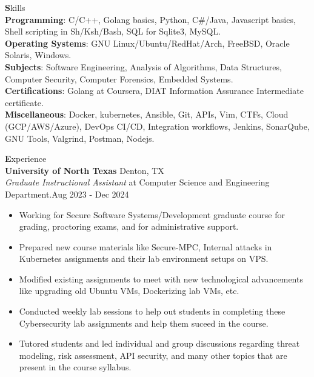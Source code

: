 \documentclass[a4paper]{article}
\begin{document}
{\textbf{S}kills \hrulefill}\\
\textbf{Programming}: C/C++, Golang basics, Python, C\#/Java, Javascript basics, Shell scripting in Sh/Ksh/Bash, SQL for Sqlite3, MySQL. \\
\textbf{Operating Systems}: GNU Linux/Ubuntu/RedHat/Arch, FreeBSD, Oracle Solaris, Windows. \\
\textbf{Subjects}: Software Engineering, Analysis of Algorithms, Data Structures, Computer Security, Computer Forensics, Embedded Systems. \\
\textbf{Certifications}: Golang at Coursera, DIAT Information Assurance Intermediate certificate. \\
\textbf{Miscellaneous}: Docker, kubernetes, Ansible, Git, APIs, Vim, CTFs, Cloud (GCP/AWS/Azure), DevOps CI/CD, Integration workflows, Jenkins, SonarQube, GNU Tools, Valgrind, Postman, Nodejs. \\

\vspace*{1mm}


{\textbf{E}xperience \hrulefill}\\
\textbf{University of North Texas} \hfill {\small Denton, TX}\\
\textit{Graduate Instructional Assistant} at Computer Science and Engineering Department.\hfill {\small Aug 2023 - Dec 2024}\\
\vspace*{-2.5mm}
\begin{itemize} \itemsep -1mm
	\item Working for Secure Software Systems/Development graduate course
	for grading, proctoring exams, and for administrative support.
	\item Prepared new course materials like Secure-MPC, Internal attacks in
	Kubernetes assignments and their lab environment setups on VPS.
	\item Modified existing assignments to meet with new technological
	advancements like upgrading old Ubuntu VMs, Dockerizing lab VMs, etc.
	\item Conducted weekly lab sessions to help out students in completing these
	Cybersecurity lab assignments and help them suceed in the course.
	\item Tutored students and led individual and group discussions regarding
	threat modeling, risk assessment, API security, and many other topics that
	are present in the course syllabus.
\end{itemize}
\end{document}
